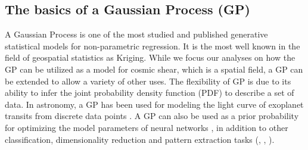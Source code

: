 \subsection{The basics of a Gaussian Process (GP)}
A Gaussian Process is one of the most studied and published 
generative statistical models for non-parametric regression. 
It is the most well known in the field of geospatial statistics as Kriging. 
While we focus our analyses on how the GP can be utilized as a model 
for cosmic shear, which is a spatial field, a GP can be extended to 
allow a variety of other uses. 
The flexibility of GP is due to its ability to infer 
the joint probability density 
function (PDF) to describe a set of data. 
In astronomy, a GP has been used for modeling 
the light curve of exoplanet transits from discrete data points
\citep{Ambikasaran2014a}. 
A GP can also be used as a prior probability for optimizing the 
model parameters of neural networks \citep{Snoek2012}, in addition to 
other classification, dimensionality reduction 
and pattern extraction tasks
(\citealt{Wilson2013}, \citealt{Duvenaud2013}, \citealt{Rasmussen2006}).
 
